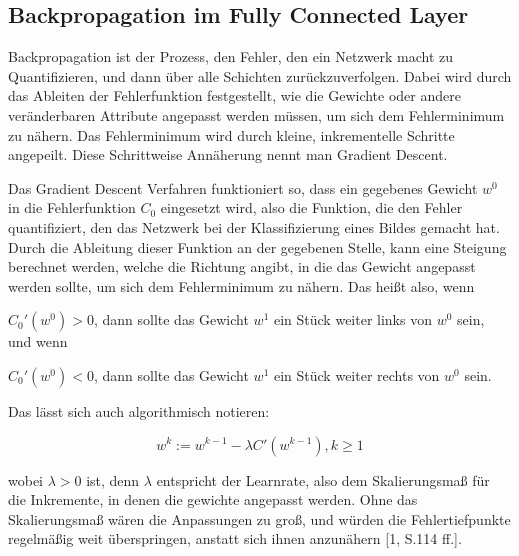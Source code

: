 \documentclass[12pt]{article}
\begin{document}
\subsection{Backpropagation im Fully Connected Layer}
Backpropagation ist der Prozess, den Fehler, den ein Netzwerk macht zu Quantifizieren, und dann über alle Schichten zurückzuverfolgen. Dabei wird durch das Ableiten der Fehlerfunktion festgestellt, wie die Gewichte oder andere veränderbaren Attribute angepasst werden müssen, um sich dem Fehlerminimum zu nähern. Das Fehlerminimum wird durch kleine, inkrementelle Schritte angepeilt. Diese Schrittweise Annäherung nennt man Gradient Descent. 

Das Gradient Descent Verfahren funktioniert so, dass ein gegebenes Gewicht $w^0$ in die Fehlerfunktion $C_0$ eingesetzt wird, also die Funktion, die den Fehler quantifiziert, den das Netzwerk bei der Klassifizierung eines Bildes gemacht hat. Durch die Ableitung dieser Funktion an der gegebenen Stelle, kann eine Steigung berechnet werden, welche die Richtung angibt, in die das Gewicht angepasst werden sollte, um sich dem Fehlerminimum zu nähern. 
Das heißt also, wenn 

$C_0'(w^0)>0$, dann sollte das Gewicht $w^1$ ein Stück weiter links von $w^0$ sein, und wenn

$C_0'(w^0)<0$, dann sollte das Gewicht $w^1$ ein Stück weiter rechts von $w^0$ sein.

Das lässt sich auch algorithmisch notieren:

$$w^k:=w^{k-1}-\lambda C'(w^{k-1}), k \geq 1$$

wobei $\lambda > 0$ ist, denn $\lambda$ entspricht der Learnrate, also dem Skalierungsmaß für die Inkremente, in denen die gewichte angepasst werden. Ohne das Skalierungsmaß wären die Anpassungen zu groß, und würden die Fehlertiefpunkte regelmäßig weit überspringen, anstatt sich ihnen anzunähern [1, S.114 ff.]. 
\end{document}
